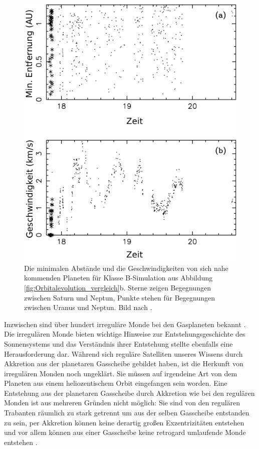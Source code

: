 \documentclass[12pt,a4paper,twoside,open=right,bibliography=totoc]{scrbook}
\renewcommand{\cite}{ \citep}
\begin{document}
\begin{figure}[tbn] %
\centering
\includegraphics[scale=1]{img/Nesvorny2007-2}
\caption{Die minimalen Abstände und die Geschwindigkeiten von sich nahe kommenden Planeten für Klasse B-Simulation aus Abbildung \ref{fig:Orbitalevolution_vergleich}b. Sterne zeigen Begegnungen zwischen Saturn und Neptun, Punkte stehen für Begegnungen zwischen Uranus und Neptun. Bild nach \cite{Nesvorny2007}.}
\label{fig:Begegnungen}
\end{figure}
Inzwischen sind über hundert irreguläre Monde bei den Gasplaneten bekannt\cite{Nicholson2008}.
Die irregulären Monde bieten wichtige Hinweise zur Entstehungsgeschichte des Sonnensystems und das Verständnis ihrer Entstehung stellte ebenfalls eine Herausforderung dar.
Während sich reguläre Satelliten unseres Wissens durch Akkretion aus der planetaren Gasscheibe gebildet haben, ist die Herkunft von irregulären Monden noch ungeklärt.
Sie müssen auf irgendeine Art von dem Planeten aus einem heliozentischem Orbit eingefangen sein worden. Eine Entstehung aus der planetaren Gasscheibe durch Akkretion wie bei den regulären Monden ist aus mehreren Gründen nicht möglich:
Sie sind von den regulären Trabanten räumlich zu stark getrennt um aus der selben Gasscheibe entstanden zu sein, per Akkretion können keine derartig großen Exzentrizitäten entstehen und vor allem können aus einer Gasscheibe keine retrogard umlaufende Monde entstehen\cite{Nesvorny2007}.
\end{document}
